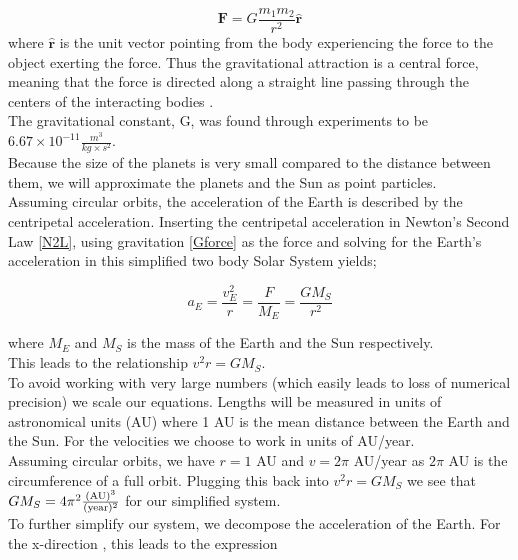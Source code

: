 \documentclass[12pt]{article}
\numberwithin{figure}{section}
\numberwithin{table}{section}
\begin{document}
\begin{equation}
		\label{Gforce}
        \mathbf{F} = G \frac{m_1 m_2}{r^2}\hat{\mathbf{r}}
\end{equation}
\noindent where $\hat{\mathbf{r}}$ is the unit vector pointing from the body experiencing the force to the object exerting the force.  Thus the gravitational attraction is a central force, meaning that the force is directed along a straight line passing through the centers of the interacting bodies \cite{VGS-FYS}.  \\
\noindent The gravitational constant, G, was found through experiments to be $6.67\times 10^{-11} \frac{m^3}{kg\times s^2}$.\\
\noindent Because the size of the planets is very small compared to the distance between them, we will approximate the planets and the Sun as point particles. \\

\noindent Assuming circular orbits, the acceleration of the Earth is described by the centripetal acceleration. Inserting the centripetal acceleration in Newton's Second Law \eqref{N2L}, using gravitation \eqref{Gforce} as the force and solving for the Earth's acceleration in this simplified two body Solar System yields;

\begin{equation}
	a_E = \frac{v_E^2}{r} = \frac{F}{M_E} =  \frac{G M_S}{r^2}
\end{equation}

\noindent where $M_E$ and $M_S$ is the mass of the Earth and the Sun respectively.\\
This leads to the relationship $v^2 r = G M_S$.\\

\noindent To avoid working with very large numbers (which easily leads to loss of numerical precision) we scale our equations. Lengths will be measured in units of astronomical units (AU) where  1 AU is the mean distance between the Earth and the Sun. For the velocities we choose to work in units of AU/year. \\

\noindent Assuming circular orbits, we have $r=1$ AU and $v=2\pi $ AU/year as $2\pi $ AU is the circumference of a full orbit. Plugging this back into $v^2 r = G M_S$ we see that $G M_S = 4 \pi^2\frac{(\textnormal{AU})^3}{(\textnormal{year})^2}$ for our simplified system. \\

\noindent To further simplify our system, we decompose the acceleration of the Earth. For the x-direction , this leads to the expression
\end{document}
